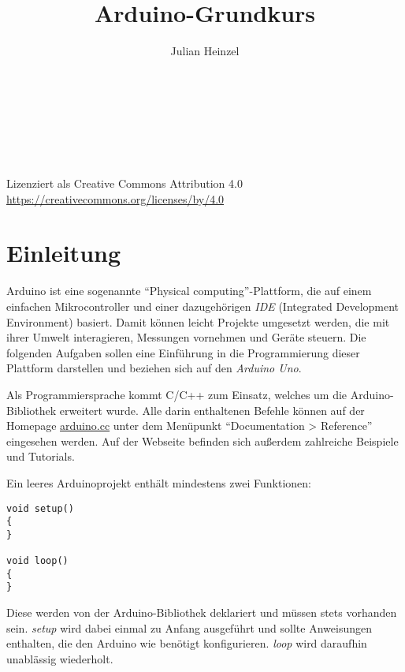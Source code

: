 \documentclass[10pt,a4paper]{article}
\title{Arduino-Grundkurs}
\author{Julian Heinzel}
\begin{document}
\begin{center}
	\makeatletter
	{\LARGE\textbf{\@title}}\\\bigskip
	{\Large\@author}\\\medskip
	{\large\@date}\\
	\makeatother
	\vspace{0.3cm}
	\\\medskip
	Lizenziert als Creative Commons Attribution 4.0\\
	\url{https://creativecommons.org/licenses/by/4.0}
	\\\medskip
	{\huge\ccby}
\end{center}
\vspace{0.3cm}
\tableofcontents
\vspace{1cm}





\section{Einleitung}
Arduino ist eine sogenannte "`Physical computing"'-Plattform, die auf einem einfachen Mikrocontroller und einer dazugehörigen \emph{IDE} (Integrated Development Environment) basiert. Damit können leicht Projekte umgesetzt werden, die mit ihrer Umwelt interagieren, Messungen vornehmen und Geräte steuern. Die folgenden Aufgaben sollen eine Einführung in die Programmierung dieser Plattform darstellen und beziehen sich auf den \emph{Arduino Uno}.
\bigskip

Als Programmiersprache kommt C/C++ zum Einsatz, welches um die Arduino-Bibliothek erweitert wurde. Alle darin enthaltenen Befehle können auf der Homepage \href{https://www.arduino.cc/reference/de/}{arduino.cc} unter dem Menüpunkt "`Documentation > Reference"' eingesehen werden. Auf der Webseite befinden sich außerdem zahlreiche Beispiele und Tutorials.
\bigskip

Ein leeres Arduinoprojekt enthält mindestens zwei Funktionen:
\begin{lstlisting}[style=multiline]
void setup()
{
}

void loop()
{
}
\end{lstlisting}

Diese werden von der Arduino-Bibliothek deklariert und müssen stets vorhanden sein. \emph{setup} wird dabei einmal zu Anfang ausgeführt und sollte Anweisungen enthalten, die den Arduino wie benötigt konfigurieren.
\emph{loop} wird daraufhin unablässig wiederholt.
\end{document}
